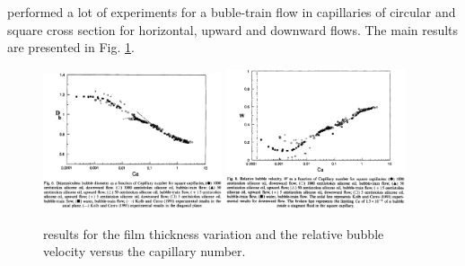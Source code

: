\documentclass{article}
\begin{document}
\citet{cerro-bubble-train} performed a lot of experiments for a buble-train flow in capillaries of
circular and square cross section for horizontal, upward and downward flows. The main results are
presented in Fig. \ref{fig:thulasidas:results}.
\begin{figure}
\includegraphics[width=0.47\textwidth]{Figures/thulasidas_capillary.eps}\hfill
\includegraphics[width=0.47\textwidth]{Figures/thulasidas_relative_velocity.eps}\\
\caption{\citet{cerro-bubble-train} results for the film thickness
variation and the relative bubble velocity versus the capillary
number.\label{fig:thulasidas:results}}
\end{figure}
\end{document}
